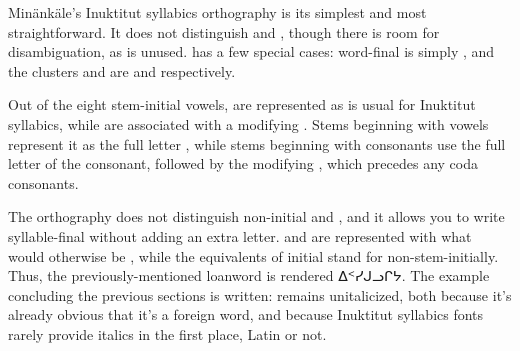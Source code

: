 \noindent Min\"ank\"ale's Inuktitut syllabics orthography is its simplest and
most straightforward. It does not distinguish  and , though
there is room for disambiguation, as  is unused.
 has a few special cases: word-final  is simply
, and the clusters  and  are 
and  respectively.

Out of the eight stem-initial
vowels, \mbox{} are represented as is usual for Inuktitut syllabics,
while \mbox{} are associated with a modifying . Stems beginning with vowels represent it as the full letter
, while stems beginning with consonants use the full letter of
the consonant, followed by the modifying , which precedes any
coda consonants.

The orthography does not distinguish non-initial  and , and it
allows you to write syllable-final  without adding an extra letter.
 and  are represented with what would otherwise be \mbox{}, while the equivalents of initial \mbox{} stand for \mbox{} non-stem-initially. Thus, the previously-mentioned loanword
 is rendered {\inufont ᐃᑉᓯᒍᓗᒋᔭ}. The example concluding the
previous sections is written:
\enlargethispage{2.5cm}  remains unitalicized, both because it's
already obvious that it's a foreign word, and because Inuktitut syllabics fonts
rarely provide italics in the first place, Latin or not.
\pagebreak
